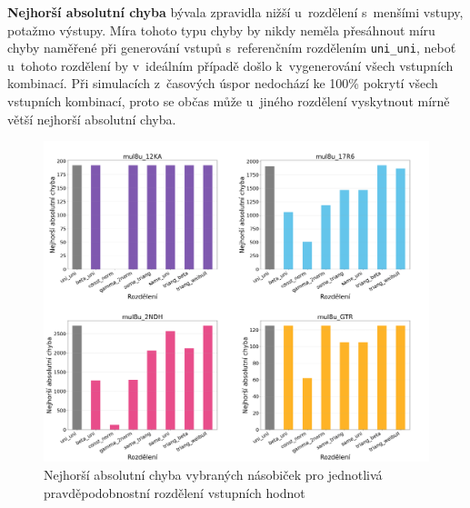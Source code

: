 \textbf{Nejhorší absolutní chyba} bývala zpravidla nižší u~rozdělení s~menšími vstupy, potažmo výstupy. Míra tohoto typu chyby by nikdy neměla přesáhnout míru chyby naměřené při generování vstupů s~referenčním rozdělením \texttt{uni\_uni}, neboť u~tohoto rozdělení by v~ideálním případě došlo k~vygenerování všech vstupních kombinací. Při simulacích z~časových úspor nedochází ke 100\% pokrytí všech vstupních kombinací, proto se občas může u~jiného rozdělení vyskytnout mírně větší nejhorší absolutní chyba.

\begin{figure}[H]
    \centering
    \includegraphics[width=\textwidth]{obrazky-figures/metrics_worst_case_error.png}
    \caption{Nejhorší absolutní chyba vybraných násobiček pro jednotlivá pravděpodobnostní rozdělení vstupních hodnot}
    \label{fig:metrics_worst_case_error}
\end{figure}

